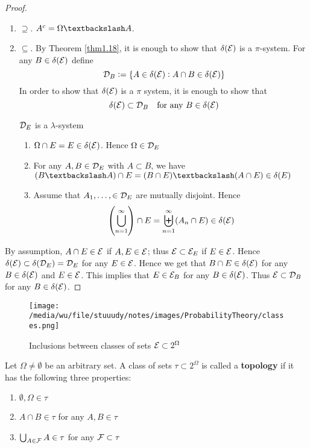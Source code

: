 \documentclass[11pt]{article}
\begin{document}
\begin{proof}
\begin{enumerate}
\item \(\supseteq\). \(A^c=\Omega\textbackslash A\).
\item \(\subseteq\). By Theorem \ref{thm1.18}, it is enough to show that
\(\delta(\mathcal{E})\) is a \(\pi\)-system. For any \(B\in\delta(\mathcal{E})\) define
\begin{equation*}
\mathcal{D}_B:=\{A\in\delta(\mathcal{E}):A\cap B\in\delta(\mathcal{E})\}
\end{equation*}
In order to show that \(\delta(\mathcal{E})\) is a \(\pi\) system, it is enough to
show that 
\begin{equation*}
\delta(\mathcal{E})\subset\mathcal{D}_B\quad\text{for any }B\in\delta(\mathcal{E})
\end{equation*}

\(\mathcal{D}_E\) is a \(\lambda\)-system
\begin{enumerate}
\item \(\Omega\cap E=E\in\delta(\mathcal{E})\). Hence \(\Omega\in\mathcal{D}_E\)
\item For any \(A,B\in\mathcal{D}_E\) with \(A\subset B\), we have 
\((B\textbackslash A)\cap E=(B\cap E)\textbackslash(A\cap E)\in\delta(E)\)
\item Assume that \(A_1,\dots,\in\mathcal{D}_E\) are mutually disjoint. Hence
\begin{equation*}
\left(\displaystyle\bigcup_{n=1}^\infty\right)\cap E=
\biguplus_{n=1}^\infty(A_n\cap E)\in\delta(\mathcal{E})
\end{equation*}
\end{enumerate}
\end{enumerate}


By assumption, \(A\cap E\in\mathcal{E}\) if \(A,E\in\mathcal{E}\); thus
\(\mathcal{E}\subset\mathcal{E}_E\) if \(E\in\mathcal{E}\). Hence
\(\delta(\mathcal{E})\subset\delta(\mathcal{D}_E)=\mathcal{D}_E\) for any \(E\in\mathcal{E}\). Hence we
get that \(B\cap E\in\delta(\mathcal{E})\) for any \(B\in\delta(\mathcal{E})\) and
\(E\in\mathcal{E}\). This implies that \(E\in\mathcal{E}_B\) for any
\(B\in\delta(\mathcal{E})\). Thus \(\mathcal{E}\subset\mathcal{D}_B\) for any
\(B\in\delta(\mathcal{E})\). 
\end{proof}

\begin{figure}[htbp]
\centering
\texttt{[image: /media/wu/file/stuuudy/notes/images/ProbabilityTheory/classes.png]}
\caption{\label{fig:org87f1637}Inclusions between classes of sets \(\mathcal{E}\subset2^\Omega\)}
\end{figure}

\begin{definition}[Topology]
Let \(\Omega\neq\emptyset\) be an arbitrary set. A class of sets
\(\tau\subset2^\Omega\) is called a \textbf{topology} if it has the following three
properties:
\begin{enumerate}
\item \(\emptyset,\Omega\in\tau\)
\item \(A\cap B\in\tau\) for any \(A,B\in\tau\)
\item \(\bigcup_{A\in\mathcal{F}}A\in\tau\) for any \(\mathcal{F}\subset\tau\)
\end{enumerate}
\end{definition}
\end{document}
